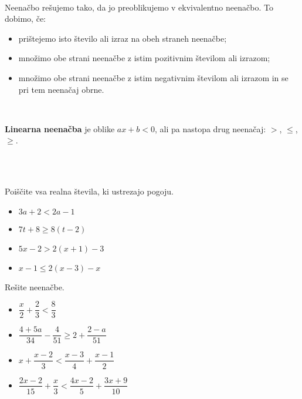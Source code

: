                 ~

                Neenačbo rešujemo tako, da jo preoblikujemo v ekvivalentno neenačbo. To dobimo, če:
                \begin{itemize}
                    \item prištejemo isto število ali izraz na obeh straneh neenačbe;
                    \item množimo obe strani neenačbe z istim pozitivnim številom ali izrazom;
                    \item množimo obe strani neenačbe z istim negativnim številom ali izrazom in se pri tem neenačaj obrne.
                \end{itemize}
            
                ~
            
                \textbf{Linearna neenačba} je oblike $ax+b<0$, ali pa nastopa drug neenačaj: $>$, $\leq$, $\geq$.
            
        
~~\\~~



        
                
                    \begin{naloga}
                        Poiščite vsa realna števila, ki ustrezajo pogoju.
                        \begin{itemize}
                                \item $3a+2<2a-1$ 
                                \item $7t+8\geq 8(t-2)$ 
                                \item $5x-2>2(x+1)-3$ 
                                \item $x-1\leq 2(x-3)-x$ 
                        \end{itemize}
                    \end{naloga}
                
        
        
                
                    \begin{naloga}
                        Rešite neenačbe.
                        \begin{itemize}
                                \item $\dfrac{x}{2}+\dfrac{2}{3}<\dfrac{8}{3}$ 
                                \item $\dfrac{4+5a}{34}-\dfrac{4}{51}\geq 2+\dfrac{2-a}{51}$ 
                                \item $x+\dfrac{x-2}{3}<\dfrac{x-3}{4}+\dfrac{x-1}{2}$ 
                                \item $\dfrac{2x-2}{15}+\dfrac{x}{3}<\dfrac{4x-2}{5}+\dfrac{3x+9}{10}$ 
                        \end{itemize}
                    \end{naloga}
                
